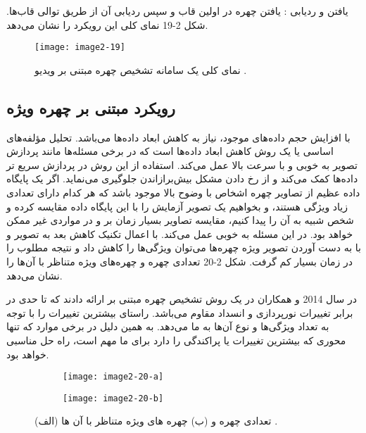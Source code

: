 \noindent
یافتن و ردیابی : یافتن چهره در اولین قاب و سپس ردیابی آن از طریق توالی قاب‌ها. شکل 2-19 نمای کلی این رویکرد را نشان می‌دهد.
 
 \begin{figure}[h]
\centering
  \texttt{[image: image2-19]}
  \caption{نمای کلی یک سامانه تشخیص چهره مبتنی بر ویدیو \cite{ref1}.}
  \label{image2-19}
\end{figure}

 \subsection{رویکرد مبتنی بر چهره ویژه}
با افزایش حجم داده‌های موجود، نیاز به کاهش ابعاد داده‌ها می‌باشد. تحلیل مؤلفه‌های اساسی یا  یک روش‌ کاهش ابعاد داده‌ها است که در برخی مسئله‌ها مانند پردازش تصویر به خوبی و با سرعت بالا عمل می‌کند. استفاده از این روش در پردازش سریع تر داده‌ها کمک می‌کند و از رخ دادن مشکل بیش‌برازاندن  جلوگیری می‌نماید. اگر یک پایگاه داده عظیم از تصاویر چهره اشخاص با وضوح بالا موجود باشد که هر کدام دارای تعدادی زیاد ویژگی هستند، و بخواهیم یک تصویر آزمایش را با این پایگاه داده مقایسه کرده و شخص شبیه به آن را پیدا کنیم، مقایسه تصاویر بسیار زمان بر و در مواردی غیر ممکن خواهد بود.  در این مسئله به خوبی عمل می‌کند. با اعمال تکنیک کاهش بعد به تصویر و با به دست آوردن تصویر ویژه چهره‌ها می‌توان ویژگی‌ها را کاهش داد و نتیجه مطلوب را در زمان بسیار کم گرفت. شکل 2-20 تعدادی چهره و چهره‌های ویژه متناظر با آن‌ها را نشان می‌دهد.

\noindent
در سال 2014  و همکاران در \cite{LUAN2014495} یک روش تشخیص چهره مبتنی بر  ارائه دادند که تا حدی در برابر تغییرات نورپردازی و انسداد مقاوم می‌باشد.  راستای بیشترین تغییرات را با توجه به تعداد ویژگی‌ها و نوع آن‌ها به ما می‌دهد. به همین دلیل در برخی موارد که تنها محوری که بیشترین تغییرات یا پراکندگی را دارد برای ما مهم است، راه حل مناسبی خواهد بود. 

\begin{figure}
\begin{subfigure}{.5\textwidth}
  \centering
  \texttt{[image: image2-20-a]}
  \label{image2-20-a}
\end{subfigure}
\begin{subfigure}{.5\textwidth}
  \centering
  \texttt{[image: image2-20-b]}
  \label{image2-20-b}
\end{subfigure}
  \caption{ (الف) تعدادی چهره و (ب) چهره های ویژه متناظر با آن ها \cite{ref1}.}
\label{fig:image2-20}
\end{figure}

